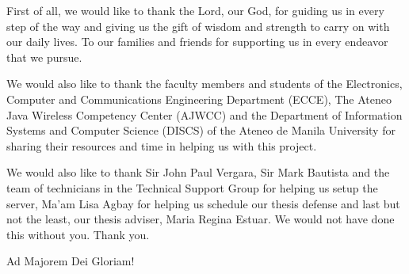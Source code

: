\begin{acknowledgments}

\bigskip
First of all, we would like to thank the Lord, our God, for guiding us in every step of the way and giving us the gift of wisdom and strength to carry on with our daily lives. To our families and friends for supporting us in every endeavor that we pursue.  
   
\bigskip
We would also like to thank the faculty members and students of the Electronics, Computer and Communications Engineering Department (ECCE),  The Ateneo Java Wireless Competency Center (AJWCC) and the Department of Information Systems and Computer Science (DISCS) of the Ateneo de Manila University for sharing their resources and time in helping us with this project.    

\bigskip
We would also like to thank Sir John Paul Vergara, Sir Mark Bautista and the team of technicians in the Technical Support Group for helping us setup the server, Ma'am Lisa Agbay for helping us schedule our thesis defense and last but not the least, our thesis adviser, Maria Regina Estuar. We would not have done this without you. Thank you.

\bigskip
Ad Majorem Dei Gloriam!
\end{acknowledgments}